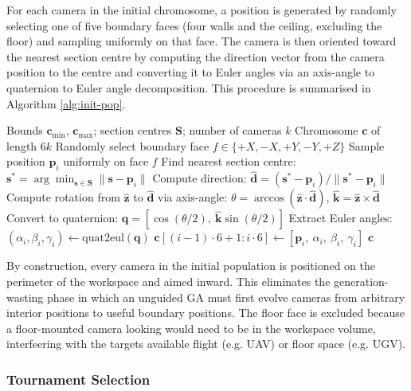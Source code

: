 For each camera in the initial chromosome, a position is generated by randomly selecting one of five boundary faces (four walls and the ceiling, excluding the floor) and sampling uniformly on that face. The camera is then oriented toward the nearest section centre by computing the direction vector from the camera position to the centre and converting it to Euler angles via an axis-angle to quaternion to Euler angle decomposition. This procedure is summarised in Algorithm \ref{alg:init-pop}.

\begin{algorithm}[htbp]
\caption{Guided Initial Population Generation}
\label{alg:init-pop}
\begin{algorithmic}[1]
\REQUIRE Bounds $\mathbf{c}_{\min}$, $\mathbf{c}_{\max}$; section centres $\mathbf{S}$; number of cameras $k$
\ENSURE Chromosome $\mathbf{c}$ of length $6k$
    \STATE Randomly select boundary face $f \in \{+X, -X, +Y, -Y, +Z\}$
    \STATE Sample position $\mathbf{p}_i$ uniformly on face $f$
    \STATE Find nearest section centre: $\mathbf{s}^* = \arg\min_{\mathbf{s} \in \mathbf{S}} \|\mathbf{s} - \mathbf{p}_i\|$
    \STATE Compute direction: $\hat{\mathbf{d}} = (\mathbf{s}^* - \mathbf{p}_i) / \|\mathbf{s}^* - \mathbf{p}_i\|$
    \STATE Compute rotation from $\hat{\mathbf{z}}$ to $\hat{\mathbf{d}}$ via axis-angle: $\theta = \arccos(\hat{\mathbf{z}} \cdot \hat{\mathbf{d}})$, $\hat{\mathbf{k}} = \hat{\mathbf{z}} \times \hat{\mathbf{d}}$
    \STATE Convert to quaternion: $\mathbf{q} = [\cos(\theta/2),\ \hat{\mathbf{k}}\sin(\theta/2)]$
    \STATE Extract Euler angles: $(\alpha_i, \beta_i, \gamma_i) \leftarrow \text{quat2eul}(\mathbf{q})$ 
    \STATE $\mathbf{c}[(i{-}1) \cdot 6 + 1 : i \cdot 6] \leftarrow [\mathbf{p}_i,\ \alpha_i,\ \beta_i,\ \gamma_i]$
\ENDFOR
\RETURN $\mathbf{c}$
\end{algorithmic}
\end{algorithm}

By construction, every camera in the initial population is positioned on the perimeter of the workspace and aimed inward. This eliminates the generation-wasting phase in which an unguided GA must first evolve cameras from arbitrary interior positions to useful boundary positions. The floor face is excluded because a floor-mounted camera looking would need to be in the workspace volume, interfeering with the targets available flight (e.g. \gls{UAV}) or floor space (e.g. \gls{UGV}). 
\subsubsection{Tournament Selection}
\label{sec:tournament-selection}

